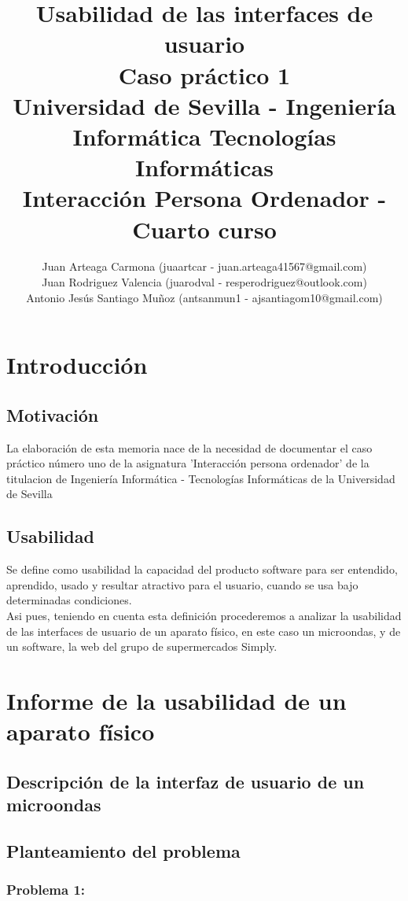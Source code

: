 \documentclass[a4paper,11pt]{article}
\title{
        \textbf{Usabilidad de las interfaces de usuario}\large\\
        \textbf{Caso práctico 1}\\
        \medskip
        Universidad de Sevilla - Ingeniería Informática Tecnologías Informáticas\\
        Interacción Persona Ordenador - Cuarto curso}
\author{Juan Arteaga Carmona (juaartcar - juan.arteaga41567@gmail.com)\\
        Juan Rodriguez Valencia (juarodval - resperodriguez@outlook.com)\\
        Antonio Jesús Santiago Muñoz (antsanmun1 - ajsantiagom10@gmail.com)\\
}
\begin{document}
\maketitle


\newpage
\tableofcontents
\listoffigures
\newpage

\section{Introducción}
\subsection{Motivación}
La elaboración de esta memoria nace de la necesidad de documentar el caso práctico número uno de la asignatura 'Interacción persona ordenador' de la titulacion de Ingeniería Informática - Tecnologías Informáticas de la Universidad de Sevilla
\subsection{Usabilidad}
Se define como usabilidad la capacidad del producto software para ser entendido, aprendido, usado y resultar atractivo para el usuario, cuando se usa bajo determinadas condiciones. \cite{diapTema1} \cite{iso25010}\\
Asi pues, teniendo en cuenta esta definición procederemos a analizar la usabilidad de las interfaces de usuario de un aparato físico, en este caso un microondas, y de un software, la web del grupo de supermercados Simply.


\section{Informe de la usabilidad de un aparato físico}
\subsection{Descripción de la interfaz de usuario de un microondas}
\subsection{Planteamiento del problema}
\subsubsection{Problema 1: }
\end{document}
